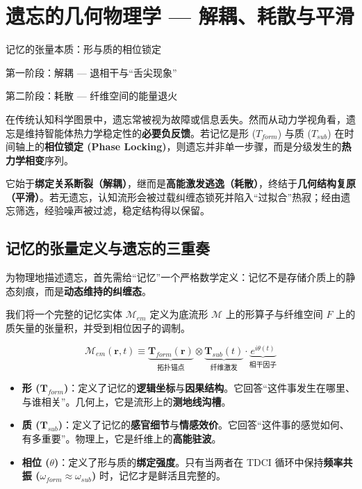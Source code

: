 \chapter{遗忘的几何物理学 — 解耦、耗散与平滑}
\label{chap:geometry_of_oblivion}

\begin{introduction}
    \item 记忆的张量本质：形与质的相位锁定
    \item 第一阶段：解耦 — 退相干与“舌尖现象”
    \item 第二阶段：耗散 — 纤维空间的能量退火
\end{introduction}

在传统认知科学图景中，遗忘常被视为故障或信息丢失。然而从动力学视角看，遗忘是维持智能体热力学稳定性的\textbf{必要负反馈}。若记忆是形 ($T_{form}$) 与质 ($T_{sub}$) 在时间轴上的\textbf{相位锁定 (Phase Locking)}，则遗忘并非单一步骤，而是分级发生的\textbf{热力学相变}序列。

它始于\textbf{绑定关系断裂（解耦）}，继而是\textbf{高能激发逃逸（耗散）}，终结于\textbf{几何结构复原（平滑）}。若无遗忘，认知流形会被过载纠缠态锁死并陷入“过拟合”热寂；经由遗忘筛选，经验噪声被过滤，稳定结构得以保留。

\section{记忆的张量定义与遗忘的三重奏}
\label{sec:tensor_definition_of_memory}

为物理地描述遗忘，首先需给“记忆”一个严格数学定义：记忆不是存储介质上的静态刻痕，而是\textbf{动态维持的纠缠态}。


我们将一个完整的记忆实体 $\mathcal{M}_{em}$ 定义为底流形 $\mathcal{M}$ 上的形算子与纤维空间 $F$ 上的质矢量的张量积，并受到相位因子的调制。

\begin{definition}[全息记忆张量]
    $$ \mathcal{M}_{em}(\mathbf{r}, t) \equiv \underbrace{\mathbf{T}_{form}(\mathbf{r})}_{\text{拓扑锚点}} \otimes \underbrace{\mathbf{T}_{sub}(t)}_{\text{纤维激发}} \cdot \underbrace{e^{i\theta(t)}}_{\text{相干因子}} $$
\end{definition}

\begin{itemize}
    \item \textbf{形 ($\mathbf{T}_{form}$)}：定义了记忆的\textbf{逻辑坐标}与\textbf{因果结构}。它回答“这件事发生在哪里、与谁相关”。几何上，它是流形上的\textbf{测地线沟槽}。
    \item \textbf{质 ($\mathbf{T}_{sub}$)}：定义了记忆的\textbf{感官细节}与\textbf{情感效价}。它回答“这件事的感觉如何、有多重要”。物理上，它是纤维上的\textbf{高能驻波}。
    \item \textbf{相位 ($\theta$)}：定义了形与质的\textbf{绑定强度}。只有当两者在 TDCI 循环中保持\textbf{频率共振 ($\omega_{form} \approx \omega_{sub}$)} 时，记忆才是鲜活且完整的。
\end{itemize}

